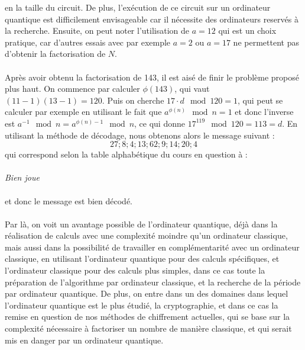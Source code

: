 en la taille du circuit.
De plus, l'exécution de ce circuit sur un ordinateur quantique est difficilement envisageable
car il nécessite des ordinateurs reservés à la recherche.
Ensuite, on peut noter l'utilisation de $a=12$ qui est un choix pratique, car d'autres essais
avec par exemple $a=2$ ou $a=17$ ne permettent pas d'obtenir la factorisation de $N$.\\ \\
Après avoir obtenu la factorisation de 143, il est aisé de finir le problème proposé plus haut.
On commence par calculer $\phi(143)$, qui vaut $(11-1)(13-1)=120$.
Puis on cherche $17 \cdot d \mod 120 = 1$, qui peut se calculer par exemple en utilisant
le fait que $a^{\phi (n)} \mod n = 1$ et donc l'inverse est $a^{-1} \mod n = a^{\phi (n)-1} \mod n$,
ce qui donne $17^{119} \mod 120 = 113 = d$.
En utilisant la méthode de décodage, nous obtenons alors le message suivant :
$$27; 8; 4; 13; 62; 9; 14; 20; 4$$
qui correspond selon la table alphabétique du cours en question à :\\ \\
\textit{Bien joue}\\ \\
et donc le message est bien décodé.\\ \\
Par là, on voit un avantage possible de l'ordinateur quantique, déjà dans la réalisation de
calculs avec une complexité moindre qu'un ordinateur classique, mais aussi dans la possibilité
de travailler en complémentarité avec un ordinateur classique, en utilisant l'ordinateur quantique
pour des calculs spécifiques, et l'ordinateur classique pour des calculs plus simples, dans ce cas
toute la préparation de l'algorithme par ordinateur classique, et la recherche de la période
par ordinateur quantique.
De plus, on entre dans un des domaines dans lequel l'ordinateur quantique est le plus étudié,
la cryptographie, et dans ce cas la remise en question de nos méthodes de chiffrement actuelles,
qui se base sur la complexité nécessaire à factoriser un nombre de manière classique, et qui
serait mis en danger par un ordinateur quantique.
